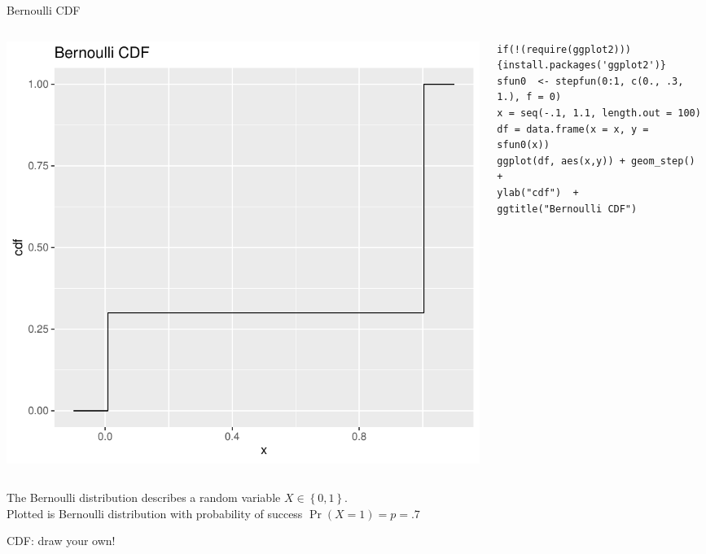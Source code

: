 \begin{frame}[fragile]{Bernoulli CDF}
\begin{columns}
\begin{column}{0.5\textwidth}
\begin{center}
\includegraphics[height=.5\textheight]{bernoulli-cdf} 
\end{center}
\end{column}
\begin{column}{0.5\textwidth} 
\begin{lstlisting}
if(!(require(ggplot2))){install.packages('ggplot2')}
sfun0  <- stepfun(0:1, c(0., .3, 1.), f = 0)  
x = seq(-.1, 1.1, length.out = 100)
df = data.frame(x = x, y = sfun0(x))
ggplot(df, aes(x,y)) + geom_step() +
ylab("cdf")  +
ggtitle("Bernoulli CDF")
\end{lstlisting}
\end{column}
\end{columns}
The Bernoulli distribution describes a random variable $X\in \left\{0,1\right\}$. \\
Plotted is Bernoulli distribution with probability of success $\Pr(X=1)=p=.7$

\end{frame}





\begin{frame}{CDF: draw your own!}
\end{frame}




